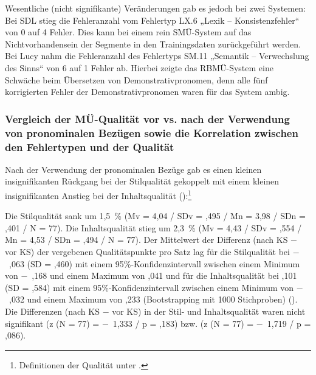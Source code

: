 Wesentliche (nicht signifikante) Veränderungen gab es jedoch bei zwei Systemen: Bei SDL stieg die Fehleranzahl vom Fehlertyp LX.6 „Lexik -- Konsistenzfehler“ von 0 auf 4 Fehler. Dies kann bei einem rein SMÜ-System auf das Nichtvorhandensein der Segmente in den Trainingsdaten zurückgeführt werden. Bei Lucy nahm die Fehleranzahl des Fehlertyps SM.11 „Semantik -- Verwechslung des Sinns“ von 6 auf 1 Fehler ab. Hierbei zeigte das RBMÜ-System eine Schwäche beim Übersetzen von Demonstrativpronomen, denn alle fünf korrigierten Fehler der Demonstrativpronomen waren für das System ambig.

\subsubsection{\label{sec:5.3.4.4}Vergleich der MÜ-Qualität vor vs. nach der Verwendung von pronominalen Bezügen sowie die Korrelation zwischen den Fehlertypen und der Qualität}

Nach der Verwendung der pronominalen Bezüge gab es einen kleinen insignifikanten Rückgang bei der Stilqualität gekoppelt mit einem kleinen insignifikanten Anstieg bei der Inhaltsqualität ():\footnote{\textrm{Definitionen der Qualität unter .}}

Die Stilqualität sank um 1,5~\% (Mv = 4,04 / SDv = ,495 / Mn = 3,98 / SDn = ,401 / N = 77). Die Inhaltsqualität stieg um 2,3~\% (Mv = 4,43 / SDv = ,554 / Mn = 4,53 / SDn = ,494 / N = 77). Der Mittelwert der Differenz (nach KS $-$ vor KS) der vergebenen Qualitätspunkte pro Satz lag für die Stilqualität bei $-$~,063 (SD = ,460) mit einem 95\%\nobreakdash-Konfidenzintervall zwischen einem Minimum von $-$~,168 und einem Maximum von ,041 und für die Inhaltsqualität bei ,101 (SD = ,584) mit einem 95\%\nobreakdash-Konfidenzintervall zwischen einem Minimum von $-$~,032 und einem Maximum von ,233 (Bootstrapping mit 1000 Stichproben) (). Die Differenzen (nach KS $-$ vor KS) in der Stil- und Inhaltsqualität waren nicht signifikant (z (N = 77) = $-$~1,333 / p = ,183) bzw. (z (N = 77) = $-$~1,719 / p = ,086).


